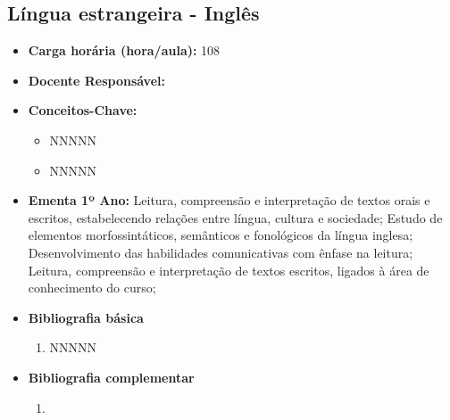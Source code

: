 \documentclass[11pt,fleqn]{book} %
\begin{document}
\subsection{Língua estrangeira - Inglês}\label{disc:ingles}
\begin{itemize}
	\item \textbf{Carga horária (hora/aula):} 108
	\item \textbf{Docente Responsável:}
	\item \textbf{Conceitos-Chave:}
	\begin{itemize}
		\item NNNNN
		\item NNNNN
	\end{itemize}
	\item \textbf{Ementa 1º Ano:} 
	Leitura, compreensão e interpretação de textos orais e escritos, estabelecendo relações entre língua, cultura e sociedade;
	Estudo de elementos morfossintáticos, semânticos e fonológicos da língua inglesa;
	Desenvolvimento das habilidades comunicativas com ênfase na leitura;
	Leitura, compreensão e interpretação de textos escritos, ligados à área de conhecimento do curso;
	\item \textbf{Bibliografia básica}
	\begin{enumerate}
		\item NNNNN
	\end{enumerate}
	\item \textbf{Bibliografia complementar}
	\begin{enumerate}
		\item 
	\end{enumerate}	
\end{itemize}


\newpage
\end{document}
